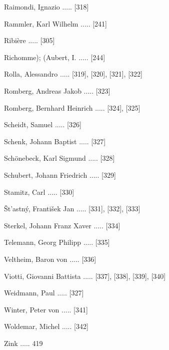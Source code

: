 \documentclass[twocolumn, 12pt]{book}
\begin{document}
\newline 
Raimondi, Ignazio ..... [318]

\newline 
Rammler, Karl Wilhelm ..... [241]

\newline 
Ribière ..... [305]

\newline 
Richomme); (Aubert, I. ..... [244]

\newline 
Rolla, Alessandro ..... [319], [320], [321], [322]

\newline 
Romberg, Andreas Jakob ..... [323]

\newline 
Romberg, Bernhard Heinrich ..... [324], [325]

\newline 
Scheidt, Samuel ..... [326]

\newline 
Schenk, Johann Baptist ..... [327]

\newline 
Schönebeck, Karl Sigmund ..... [328]

\newline 
Schubert, Johann Friedrich ..... [329]

\newline 
Stamitz, Carl ..... [330]

\newline 
Št'astný, František Jan ..... [331], [332], [333]

\newline 
Sterkel, Johann Franz Xaver ..... [334]

\newline 
Telemann, Georg Philipp ..... [335]

\newline 
Veltheim, Baron von ..... [336]

\newline 
Viotti, Giovanni Battista ..... [337], [338], [339], [340]

\newline 
Weidmann, Paul ..... [327]

\newline 
Winter, Peter von ..... [341]

\newline 
Woldemar, Michel ..... [342]

\newline 
Zink ..... 419
\end{document}
